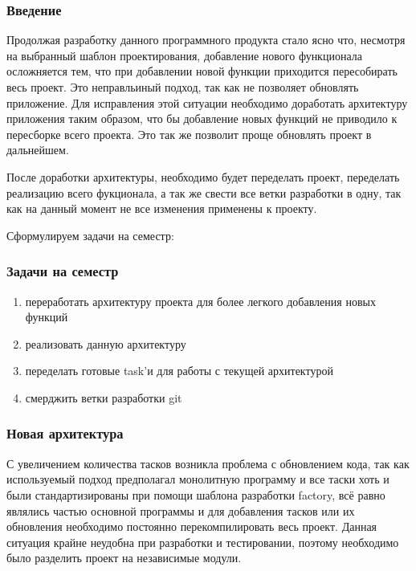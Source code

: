 \subsubsection{Введение}

Продолжая разработку данного программного продукта стало ясно что, несмотря на выбранный шаблон проектирования, добавление нового функционала осложняется тем, что при добавлении новой функции приходится пересобирать весь проект. Это неправльиный подход, так как не позволяет обновлять приложение. Для исправления этой ситуации необходимо доработать архитектуру приложения таким образом, что бы добавление новых функций не приводило к пересборке всего проекта. Это так же позволит проще обновлять проект в дальнейшем. 

После доработки архитектуры, необходимо будет переделать проект, переделать реализацию всего фукционала, а так же свести все ветки разработки в одну, так как на данный момент не все изменения применены к проекту. 

Сформулируем задачи на семестр:

\subsubsection{Задачи на семестр}

\begin{enumerate}
\item переработать архитектуру проекта для более легкого добавления новых функций
\item реализовать данную архитектуру
\item переделать готовые task'и для работы с текущей архитектурой
\item смерджить ветки разработки git
\end{enumerate}

\subsubsection{Новая архитектура}

С увеличением количества тасков возникла проблема с обновлением кода, так как используемый подход предполагал монолитную программу и все таски хоть и были стандартизированы при помощи шаблона разработки factory, всё равно являлись частью основной программы и для добавления тасков или их обновления необходимо постоянно перекомпилировать весь проект. Данная ситуация крайне неудобна при разработки и тестировании, поэтому необходимо было разделить проект на независимые модули.

